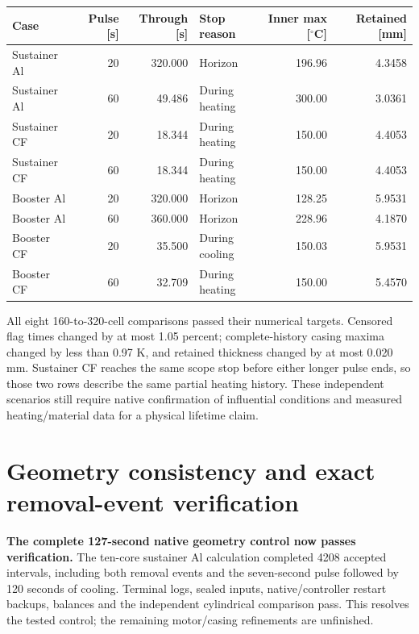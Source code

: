 \documentclass[oneside,openany]{amsdtx}
\begin{document}
\begin{table}[H]\centering\scriptsize\begin{tabular}{lrrlrr}\toprule Case & Pulse [s] & Through [s] & Stop reason & Inner max [$^\circ$C] & Retained [mm]\\\midrule

Sustainer Al & 20 & 320.000 & Horizon & 196.96 & 4.3458 \\
Sustainer Al & 60 & 49.486 & During heating & 300.00 & 3.0361 \\
Sustainer CF & 20 & 18.344 & During heating & 150.00 & 4.4053 \\
Sustainer CF & 60 & 18.344 & During heating & 150.00 & 4.4053 \\
Booster Al & 20 & 320.000 & Horizon & 128.25 & 5.9531 \\
Booster Al & 60 & 360.000 & Horizon & 228.96 & 4.1870 \\
Booster CF & 20 & 35.500 & During cooling & 150.03 & 5.9531 \\
Booster CF & 60 & 32.709 & During heating & 150.00 & 5.4570 \\

\bottomrule\end{tabular}\end{table}

All eight 160-to-320-cell comparisons passed their numerical targets. Censored flag times changed by at most 1.05 percent; complete-history casing maxima changed by less than 0.97 K, and retained thickness changed by at most 0.020 mm. Sustainer CF reaches the same scope stop before either longer pulse ends, so those two rows describe the same partial heating history. These independent scenarios still require native confirmation of influential conditions and measured heating/material data for a physical lifetime claim.


\clearpage
\section{Geometry consistency and exact removal-event verification}
\label{sec:geometry-control}
\textbf{The complete 127-second native geometry control now passes verification.} The ten-core sustainer Al calculation completed 4208 accepted intervals, including both removal events and the seven-second pulse followed by 120 seconds of cooling. Terminal logs, sealed inputs, native/controller restart backups, balances and the independent cylindrical comparison pass. This resolves the tested control; the remaining motor/casing refinements are unfinished.
\end{document}
